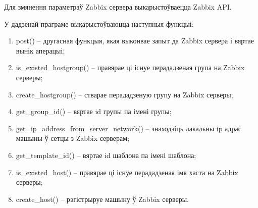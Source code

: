 Для змянення параметраў Zabbix сервера выкарыстоўваецца Zabbix API.

У дадзенай праграме выкарыстоўваюцца наступныя функцыі:
\begin{enumerate}
    \item post() -- другасная функцыя, якая выконвае запыт да Zabbix сервера і вяртае вынік аперацыі;
    \item is\_existed\_hostgroup() -- правярае ці існуе перададзеная група на Zabbix серверы;
    \item create\_hostgroup() -- стварае перададзеную групу на Zabbix серверы;
    \item get\_group\_id() --  вяртае id групы па імені групы;
    \item get\_ip\_address\_from\_server\_network() -- знаходзіць лакальны ip адрас машыны ў сетцы з Zabbix серверам;
    \item get\_template\_id() --  вяртае id шаблона па імені шаблона;
    \item is\_existed\_host() -- правярае ці існуе перададзеная імя хаста на Zabbix серверы;
    \item create\_host() -- рэгістрыруе машыну ў Zabbix серверы.
\end{enumerate}
